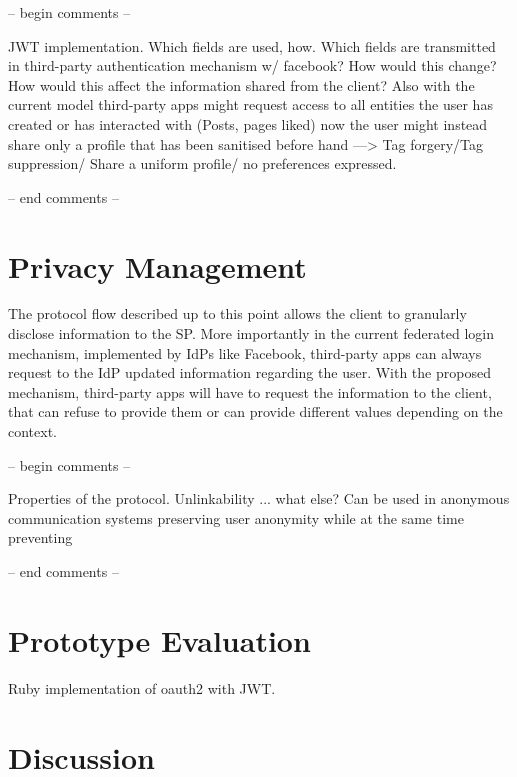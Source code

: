 -- begin comments --

JWT implementation.
Which fields are used, how.
Which fields are transmitted in third-party authentication mechanism w/ facebook? How would this change?
How would this affect the information shared from the client?
Also with the current model third-party apps might request access to all entities the user has created or has interacted with (Posts, pages liked) now the user might instead share only a profile that has been sanitised before hand ---> Tag forgery/Tag suppression/ Share a uniform profile/ no preferences expressed.

-- end comments --

\section{Privacy Management}

The protocol flow described up to this point allows the client to granularly disclose information to the SP. More importantly in the current federated login mechanism, implemented by IdPs like Facebook, third-party apps can always request to the IdP updated information regarding the user. With the proposed mechanism, third-party apps will have to request the information to the client, that can refuse to provide them or can provide different values depending on the context.

-- begin comments --

Properties of the protocol. Unlinkability ... what else?
Can be used in anonymous communication systems preserving user anonymity while at the same time preventing 

-- end comments --

\section{Prototype Evaluation}

Ruby implementation of oauth2 with JWT.

\section{Discussion}
